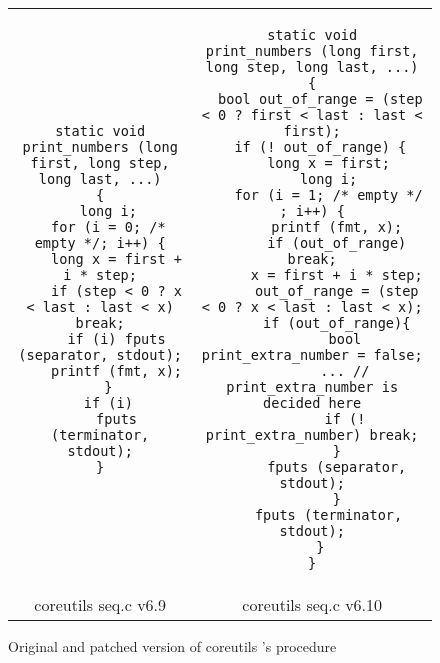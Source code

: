 \begin{figure*}
\centering
\begin{tabular}{cc}
\begin{lstlisting}
static void
print_numbers (long first, long step, long last, ...)
{
  long i;
  for (i = 0; /* empty */; i++) {
    long x = first + i * step;
    if (step < 0 ? x < last : last < x) break;
    if (i) fputs (separator, stdout);
    printf (fmt, x);
  }
  if (i)
    fputs (terminator, stdout);
}
\end{lstlisting}
\hspace{0.5cm}
&
\begin{lstlisting}
static void
print_numbers (long first, long step, long last, ...)
{
  bool out_of_range = (step < 0 ? first < last : last < first);
  if (! out_of_range) {
    long x = first;
    long i;
    for (i = 1; /* empty */ ; i++) {
      printf (fmt, x);
      if (out_of_range) break;
      x = first + i * step;
      out_of_range = (step < 0 ? x < last : last < x);
      if (out_of_range){
        bool print_extra_number = false;
        ... // print_extra_number is decided here
        if (! print_extra_number) break;
      }
      fputs (separator, stdout);
      }
    fputs (terminator, stdout);
  }
}
\end{lstlisting}
\\
coreutils seq.c v6.9 & coreutils seq.c v6.10
\end{tabular}
\caption{Original and patched version of coreutils 's  procedure}
\end{figure*} 